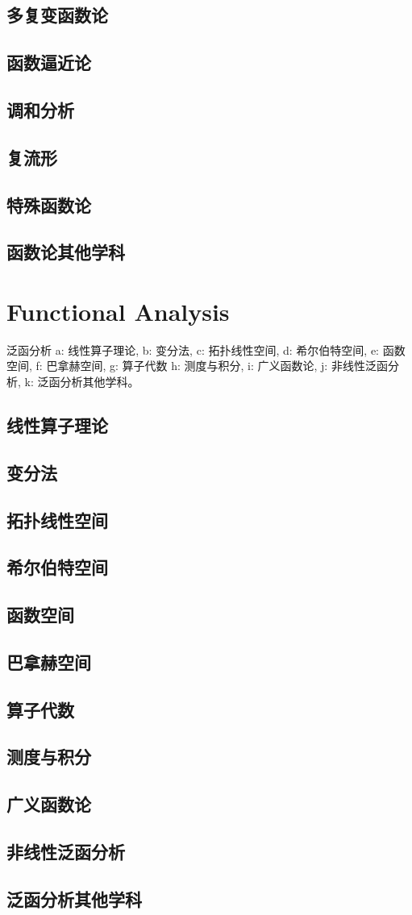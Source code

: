 \documentclass[UTF8]{../09-Mathematics}
\begin{document}
\section{多复变函数论}
\section{函数逼近论}
\section{调和分析}
\section{复流形}
\section{特殊函数论}
\section{函数论其他学科}




\chapter{Functional Analysis}

泛函分析
a: 线性算子理论, 
b: 变分法, 
c: 拓扑线性空间, 
d: 希尔伯特空间, 
e: 函数空间, 
f: 巴拿赫空间, 
g: 算子代数 
h: 测度与积分, 
i: 广义函数论, 
j: 非线性泛函分析, 
k: 泛函分析其他学科。


\section{线性算子理论}
\section{变分法}
\section{拓扑线性空间}
\section{希尔伯特空间}
\section{函数空间}
\section{巴拿赫空间}
\section{算子代数}
\section{测度与积分}
\section{广义函数论}
\section{非线性泛函分析}
\section{泛函分析其他学科}
\end{document}
